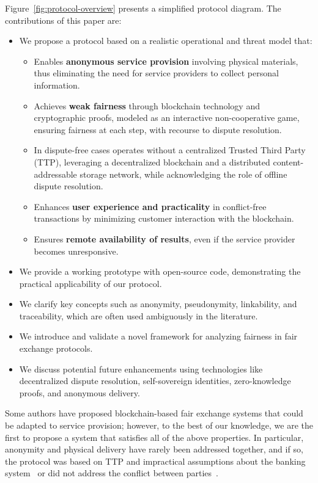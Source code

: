 \documentclass[pdftex,twocolumn,epjc3]{svjour3}
\begin{document}
\begin{sloppypar}

Figure~\ref{fig:protocol-overview} presents a simplified protocol diagram. The contributions of this paper are:
\begin{itemize}
  \item We propose a protocol based on a realistic operational and threat model that:
  \begin{itemize}
    \item Enables \textbf{anonymous service provision} involving physical materials, thus eliminating the need for service providers to collect personal information.
    \item Achieves \textbf{weak fairness} through blockchain technology and cryptographic proofs, modeled as an interactive non-cooperative game, ensuring fairness at each step, with recourse to dispute resolution.
    \item In dispute-free cases operates without a centralized Trusted Third Party (TTP), leveraging a decentralized blockchain and a distributed content-addressable storage network, while acknowledging the role of offline dispute resolution.
    \item Enhances \textbf{user experience and practicality} in conflict-free transactions by minimizing customer interaction with the blockchain.
    \item Ensures \textbf{remote availability of results}, even if the service provider becomes unresponsive.
  \end{itemize}
  \item We provide a working prototype with open-source code, demonstrating the practical applicability of our protocol.

  \item We clarify key concepts such as anonymity, pseudonymity, linkability, and traceability, which are often used ambiguously in the literature.

  \item We introduce and validate a novel framework for analyzing fairness in fair exchange protocols.

  \item We discuss potential future enhancements using technologies like decentralized dispute resolution, self-sovereign identities, zero-knowledge proofs, and anonymous delivery.
\end{itemize}

Some authors have proposed blockchain-based fair exchange systems that could be adapted to service provision; however, to the best of our knowledge, we are the first to propose a system that satisfies all of the above properties. In particular, anonymity and physical delivery have rarely been addressed together, and if so, the protocol was based on TTP and impractical assumptions about the banking system~\cite{birjoveanuAnonymityFairexchangeEcommerce2015} or did not address the conflict between parties~\cite{altawyLelantosBlockchainBasedAnonymous2017}.

\end{sloppypar}
\end{document}
